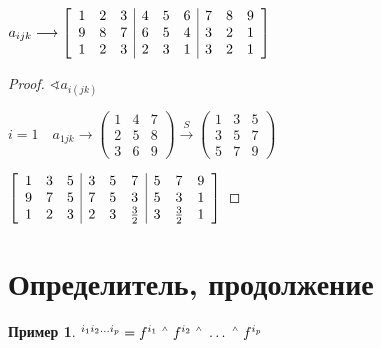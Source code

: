 \documentclass{book}
\let\latexwedge\wedge
\def\wedge{\,\raisebox{0.5ex}{\ensuremath{\scriptscriptstyle\latexwedge}\,}}
\theoremstyle{definition}
\newtheorem*{example}{Пример}
\begin{document}
\begin{problem}
    $a_{ijk} \longrightarrow \left[ 
        \begin{array}{c c c | c c c | c c c}
            1 & 2 & 3 & 4 & 5 & 6 & 7 & 8 & 9\\
            9& 8&7&6&5&4&3&2&1\\
            1&2&3&2&3&1&3&2&1\\
    \end{array}
    \right] $
\end{problem}
\begin{proof}
    $\sphericalangle a_{i\left( jk \right) }$

    $i = 1 \quad a_{1jk}\rightarrow \begin{pmatrix} 1&4&7\\2&5&8\\3&6&9 \end{pmatrix} \overset{S}{\longrightarrow} \begin{pmatrix} 1 & 3 & 5\\3 & 5 & 7 \\ 5 & 7 & 9 \end{pmatrix} $ 

    $\left[ 
        \begin{array}{c c c| c c c| c c c}
            1 & 3 & 5 & 3& 5 & 7 & 5 & 7 & 9\\
            9&7&5&7&5&3&5&3&1\\
            1&2&3&2&3&\frac{3}{2}&3 & \frac{3}{2}&1
        \end{array}
    \right] $
\end{proof}

\section{Определитель, продолжение}

\begin{example}
    $^{i_1i_2\ldots i_p} = f^{i_1}\wedge f^{i_2}\wedge \ldots \wedge f^{i_p}$
\end{example}
\end{document}
